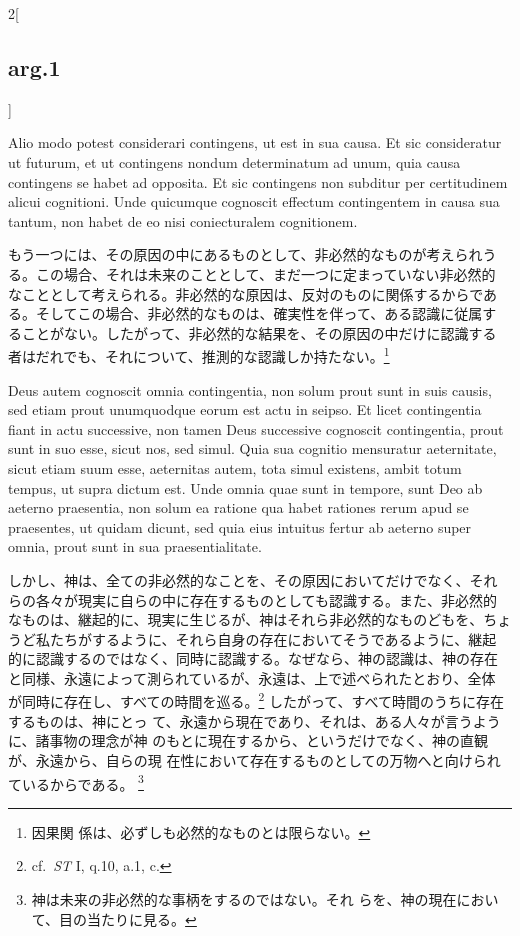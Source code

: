 \documentclass[paper=a4paper,fontsize=10pt,jafontsize=9pt,titlepage]{jlreq}
\begin{document}
\begin{paracol}{2}[\subsection{arg.1}]
\switchcolumn*

Alio modo potest considerari contingens, ut est in sua causa. Et sic
consideratur ut futurum, et ut contingens nondum determinatum ad unum,
quia causa contingens se habet ad opposita. Et sic contingens non
subditur per certitudinem alicui cognitioni. Unde quicumque cognoscit
effectum contingentem in causa sua tantum, non habet de eo nisi
coniecturalem cognitionem.

\switchcolumn

もう一つには、その原因の中にあるものとして、非必然的なものが考えられう
る。この場合、それは未来のこととして、まだ一つに定まっていない非必然的
なこととして考えられる。非必然的な原因は、反対のものに関係するからであ
る。そしてこの場合、非必然的なものは、確実性を伴って、ある認識に従属す
ることがない。したがって、非必然的な結果を、その原因の中だけに認識する
者はだれでも、それについて、推測的な認識しか持たない。\footnote{因果関
係は、必ずしも必然的なものとは限らない。}

\switchcolumn*

Deus autem cognoscit omnia contingentia, non solum prout sunt in suis
causis, sed etiam prout unumquodque eorum est actu in seipso.  Et
licet contingentia fiant in actu successive, non tamen Deus successive
cognoscit contingentia, prout sunt in suo esse, sicut nos, sed
simul. Quia sua cognitio mensuratur aeternitate, sicut etiam suum
esse, aeternitas autem, tota simul existens, ambit totum tempus, ut
supra dictum est. Unde omnia quae sunt in tempore, sunt Deo ab aeterno
praesentia, non solum ea ratione qua habet rationes rerum apud se
praesentes, ut quidam dicunt, sed quia eius intuitus fertur ab aeterno
super omnia, prout sunt in sua praesentialitate.

\switchcolumn

しかし、神は、全ての非必然的なことを、その原因においてだけでなく、それ
らの各々が現実に自らの中に存在するものとしても認識する。また、非必然的
なものは、継起的に、現実に生じるが、神はそれら非必然的なものどもを、ちょ
うど私たちがするように、それら自身の存在においてそうであるように、継起
的に認識するのではなく、同時に認識する。なぜなら、神の認識は、神の存在
と同様、永遠によって測られているが、永遠は、上で述べられたとおり、全体
が同時に存在し、すべての時間を巡る。\footnote{cf.~{\itshape ST} I,
q.10, a.1, c.} したがって、すべて時間のうちに存在するものは、神にとっ
て、永遠から現在であり、それは、ある人々が言うように、諸事物の理念が神
のもとに現在するから、というだけでなく、神の直観が、永遠から、自らの現
在性において存在するものとしての万物へと向けられているからである。
\footnote{神は未来の非必然的な事柄をするのではない。それ
らを、神の現在において、目の当たりに見る。}


\end{paracol}
\end{document}
